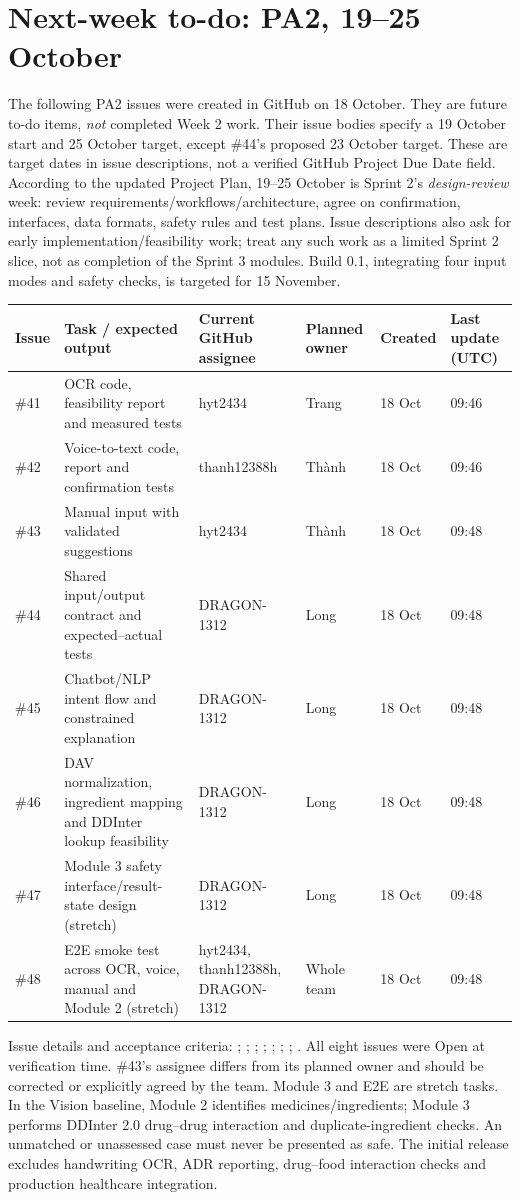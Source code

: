 \section{Next-week to-do: PA2, 19--25 October}
The following PA2 issues were created in GitHub on 18 October. They are future to-do items, \emph{not} completed Week 2 work. Their issue bodies specify a 19 October start and 25 October target, except \#44's proposed 23 October target. These are target dates in issue descriptions, not a verified GitHub Project Due Date field. According to the updated Project Plan, 19--25 October is Sprint 2's \emph{design-review} week: review requirements/workflows/architecture, agree on confirmation, interfaces, data formats, safety rules and test plans. Issue descriptions also ask for early implementation/feasibility work; treat any such work as a limited Sprint 2 slice, not as completion of the Sprint 3 modules. Build 0.1, integrating four input modes and safety checks, is targeted for 15 November.
\small
\begin{longtable}{p{0.8cm}p{4.9cm}p{2.4cm}p{2.2cm}p{1.4cm}p{1.7cm}}
\toprule Issue & Task / expected output & Current GitHub assignee & Planned owner & Created & Last update (UTC) \\ \midrule
\#41 & OCR code, feasibility report and measured tests & hyt2434 & Trang & 18 Oct & 09:46 \\
\#42 & Voice-to-text code, report and confirmation tests & thanh12388h & Thành & 18 Oct & 09:46 \\
\#43 & Manual input with validated suggestions & hyt2434 & Thành & 18 Oct & 09:48 \\
\#44 & Shared input/output contract and expected--actual tests & DRAGON-1312 & Long & 18 Oct & 09:48 \\
\#45 & Chatbot/NLP intent flow and constrained explanation & DRAGON-1312 & Long & 18 Oct & 09:48 \\
\#46 & DAV normalization, ingredient mapping and DDInter lookup feasibility & DRAGON-1312 & Long & 18 Oct & 09:48 \\
\#47 & Module 3 safety interface/result-state design (stretch) & DRAGON-1312 & Long & 18 Oct & 09:48 \\
\#48 & E2E smoke test across OCR, voice, manual and Module 2 (stretch) & hyt2434, thanh12388h, DRAGON-1312 & Whole team & 18 Oct & 09:48 \\ \bottomrule
\end{longtable}
\normalsize
Issue details and acceptance criteria: ; ; ; ; ; ; ; . All eight issues were Open at verification time. \#43's assignee differs from its planned owner and should be corrected or explicitly agreed by the team. Module 3 and E2E are stretch tasks. In the Vision baseline, Module 2 identifies medicines/ingredients; Module 3 performs DDInter 2.0 drug--drug interaction and duplicate-ingredient checks. An unmatched or unassessed case must never be presented as safe. The initial release excludes handwriting OCR, ADR reporting, drug--food interaction checks and production healthcare integration.

